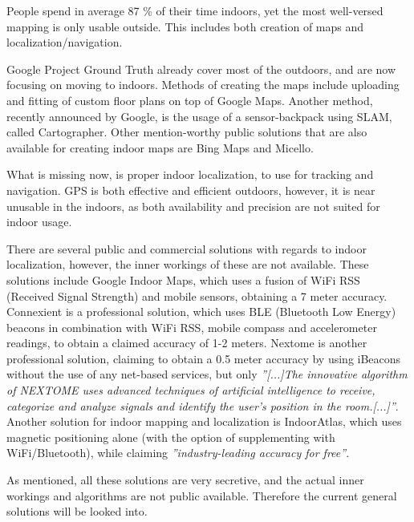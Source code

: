 
People spend in average 87 \% of their time indoors\cite{time_spend_indoor}, yet the most well-versed mapping is only usable outside.
This includes both creation of maps and localization/navigation.

Google Project Ground Truth\cite{googleio_ground_truth} already cover most of the outdoors, and are now focusing on moving to indoors\cite{googleio_indoor_maps}\cite{indoor_maps_google_slides}.
Methods of creating the maps include uploading and fitting of custom floor plans on top of Google Maps.
Another method, recently announced by Google, is the usage of a sensor-backpack using SLAM, called Cartographer\cite{cartographer}.
Other mention-worthy public solutions that are also available for creating indoor maps are Bing Maps\cite{bingmaps} and Micello\cite{micello}.

What is missing now, is proper indoor localization, to use for tracking and navigation.
GPS\cite{gps} is both effective and efficient outdoors, however, it is near unusable in the indoors, as both availability and precision are not suited for indoor usage.

There are several public and commercial solutions with regards to indoor localization, however, the inner workings of these are not available.
These solutions include Google Indoor Maps, which uses a fusion of WiFi RSS (Received Signal Strength) and mobile sensors, obtaining a 7 meter accuracy\cite{googleio_indoor_maps}.
Connexient is a professional solution, which uses BLE (Bluetooth Low Energy) beacons in combination with WiFi RSS, mobile compass and accelerometer readings, to obtain a claimed accuracy of 1-2 meters\cite{connexient_indoor_pos}.
Nextome is another professional solution, claiming to obtain a 0.5 meter accuracy by using iBeacons\cite{ibeacon} without the use of any net-based services, but only \textit{''[...]The innovative algorithm of NEXTOME uses advanced techniques of artificial intelligence to receive, categorize and analyze signals and identify the user’s position in the room.[...]''}\cite{nextome_indoor_pos}.
Another solution for indoor  mapping and localization is IndoorAtlas, which uses magnetic positioning alone (with the option of supplementing with WiFi/Bluetooth), while claiming \textit{''industry-leading accuracy for free''}\cite{indooratlas_features}.

As mentioned, all these solutions are very secretive, and the actual inner workings and algorithms are not public available.
Therefore the current general solutions will be looked into.